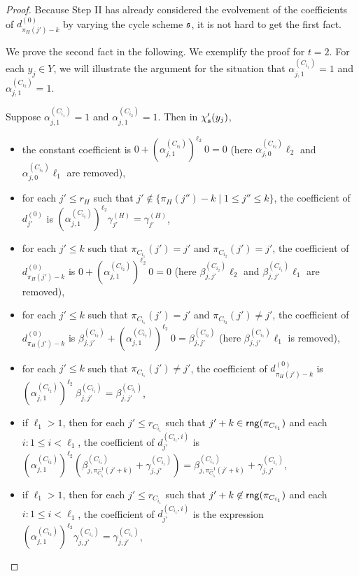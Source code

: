 \begin{proof}
Because Step II has already considered the evolvement of the coefficients of $d^{(0)}_{\pi_H(j')-k}$ by varying the cycle scheme ${\mathfrak{s} }$, it is not hard to get the first fact.

We prove the second fact in the following. We exemplify the proof for $t=2$. 
For each $y_j \in Y$, we will illustrate the argument for the situation that $\alpha^{(C_{i_1})}_{j,1} = 1$ and $\alpha^{(C_{i_2})}_{j,1} = 1$.

Suppose $\alpha^{(C_{i_1})}_{j,1} = 1$ and $\alpha^{(C_{i_2})}_{j,1} = 1$. Then in $\chi'_{\mathfrak{s} }(y_j)$,
\begin{itemize}
\item the constant coefficient is $0 + (\alpha^{(C_{i_2})}_{j,1})^{\ell_2}\  0 = 0$ (here $\alpha^{(C_{i_2})}_{j,0} \ell_2$ and $\alpha^{(C_{i_1})}_{j,0} \ell_1$ are removed),
%
%
\item for each $j' \le r_{H}$ such that $j' \not \in \{\pi_H(j'')-k \mid 1 \le j'' \le k\}$, the coefficient of $d^{(0)}_{j'}$ is $(\alpha^{(C_{i_2})}_{j,1})^{\ell_2} \gamma^{(H)}_{j'} = \gamma^{(H)}_{j'}$,
%
\item for each $j' \le k$ such that $\pi_{C_{i_1}}(j') = j'$ and $\pi_{C_{i_2}}(j') = j'$, the coefficient of $d^{(0)}_{\pi_H(j')-k}$ is $0 + (\alpha^{(C_{i_2})}_{j,1})^{\ell_2}\ 0 = 0$ (here $\beta^{(C_{i_2})}_{j,j'} \ell_2$ and $\beta^{(C_{i_1})}_{j,j'} \ell_1$ are removed),
%
\item for each $j' \le k$ such that $\pi_{C_{i_1}}(j') = j'$ and $\pi_{C_{i_2}}(j') \neq j'$, the coefficient of $d^{(0)}_{\pi_H(j')-k}$ is $\beta^{(C_{i_2})}_{j,j'} + (\alpha^{(C_{i_2})}_{j,1})^{\ell_2}\ 0 = \beta^{(C_{i_2})}_{j,j'}$ (here $\beta^{(C_{i_1})}_{j,j'} \ell_1$ is removed),
%
\item for each $j' \le k$ such that $\pi_{C_{i_1}}(j') \neq j'$, the coefficient of $d^{(0)}_{\pi_H(j')-k}$ is $(\alpha^{(C_{i_2})}_{j,1})^{\ell_2}\ \beta^{(C_{i_1})}_{j,j'} = \beta^{(C_{i_1})}_{j,j'}$,
%
\item if $\ell_1>1$, then for each $j' \le r_{C_{i_1}}$ such that $j'+k \in \mathsf{rng}(\pi_{C_{i_1}})$ and each $i: 1 \le i < \ell_1$, the coefficient of $d^{(C_{i_1},i)}_{j'}$ is $(\alpha^{(C_{i_2})}_{j,1})^{\ell_2} (\beta^{(C_{i_1})}_{j, \pi^{-1}_{C_{i_1}}(j'+k)}+\gamma^{(C_{i_1})}_{j,j'}) = \beta^{(C_{i_1})}_{j, \pi^{-1}_{C_{i_1}}(j'+k)}+\gamma^{(C_{i_1})}_{j,j'}$,
%
\item if $\ell_1>1$, then for each $j' \le r_{C_{i_1}}$ such that $j'+k \not \in \mathsf{rng}(\pi_{C_{i_1}})$ and each $i: 1 \le i < \ell_1$, the coefficient of $d^{(C_{i_1},i)}_{j'}$ is the expression $(\alpha^{(C_{i_2})}_{j,1})^{\ell_2} \gamma^{(C_{i_1})}_{j,j'} = \gamma^{(C_{i_1})}_{j,j'}$,

\end{itemize}
\end{proof}
